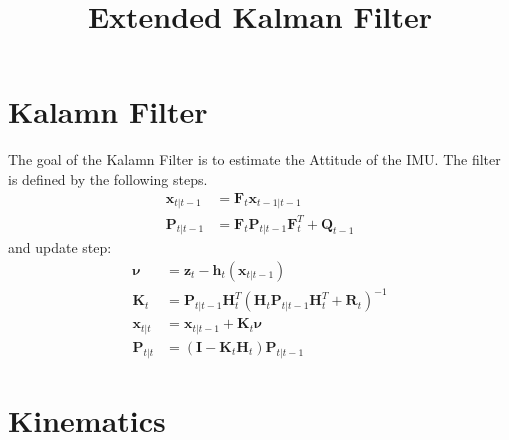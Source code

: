 \documentclass[10pt,a4paper]{article}
\newcommand{\M}[1]{\mathbf{#1}}
\newcommand{\V}[1]{\mathbf{#1}}
\begin{document}
\title{Extended Kalman Filter}

\maketitle

\section{Kalamn Filter}
The goal of the Kalamn Filter is to estimate the Attitude of the IMU.
The filter is defined by the following steps.
\begin{align}
    \V x_{t|t-1} &= \M F_t \V x_{t-1|t-1} \\ 
    \M P_{t|t-1} &= \M F_t \M P_{t|t-1} \M F_t^T + \M Q_{t-1}
\end{align}
and update step:
\begin{align}
    \boldsymbol \nu &=  \V z_t - \M h_t( \V x_{t|t-1} )\\
    \V K_t &= \M P_{t|t-1} \M H_t^T \left( \M H_t \M P_{t|t-1} \M H_t^T + \M R_t \right)^{-1} \\
    \V x_{t|t} &= \V x_{t|t-1} + \V K_t \boldsymbol \nu \\
    \M P_{t|t} &= \left( \M I - \V K_t \M H_t \right) \M P_{t|t-1}
\end{align}


\section{Kinematics}
\end{document}
